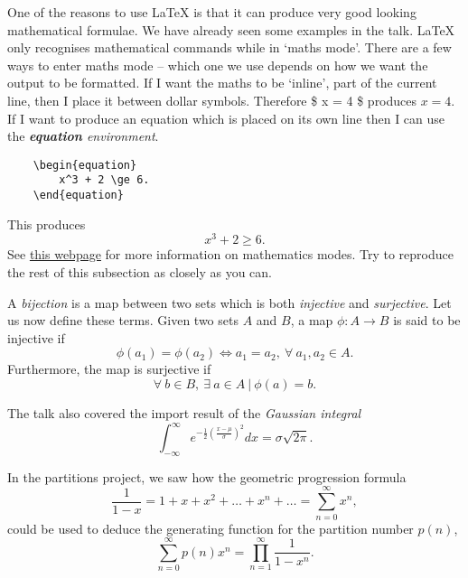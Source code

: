 \documentclass{article}
\begin{document}
One of the reasons to use \LaTeX{} is that it can produce very good looking mathematical formulae. We have already seen some examples in the talk. \LaTeX{} only recognises mathematical commands while in `maths mode'. There are a few ways to enter maths mode -- which one we use depends on how we want the output to be formatted. If I want the maths to be `inline', part of the current line, then I place it between dollar symbols. Therefore \$ x = 4 \$ produces $x=4$. If I want to produce an equation which is placed on its own line then I can use the \emph{\textbf{equation} environment}.
\begin{verbatim}
	\begin{equation}
	    x^3 + 2 \ge 6.
	\end{equation}
\end{verbatim}
This produces
\begin{equation}
	x^3 + 2 \ge 6.
\end{equation}
See \href{https://www.sharelatex.com/learn/Mathematical_expressions}{this webpage} for more information on mathematics modes. Try to reproduce the rest of this subsection as closely as you can.

A \emph{bijection} is a map between two sets which is both \emph{injective} and \emph{surjective}. Let us now define these terms. Given two sets $A$ and $B$, a map $\phi:A \to B$ is said to be injective if
\begin{equation}\label{eq:injective} %
	\phi(a_1) = \phi(a_2) \iff a_1 = a_2,\ \forall\ a_1,a_2 \in A.
\end{equation}
Furthermore, the map is surjective if
\begin{equation}\label{eq:surjective}
	\forall\ b \in B,\ \exists\ a \in A\ |\ \phi(a)=b.
\end{equation}

The talk also covered the import result of the \emph{Gaussian integral}
\begin{equation}
	\int_{-\infty}^\infty e^{-\frac{1}{2}\left( \frac{x - \mu}{\sigma} \right)^2} dx = \sigma\sqrt{2 \pi}.
\end{equation}

In the partitions project, we saw how the geometric progression formula
\begin{equation}
	\frac{1}{1-x} = 1 + x + x^2 + \ldots + x^n + \ldots = \sum_{n=0}^\infty x^n,
\end{equation}
could be used to deduce the generating function for the partition number $p(n)$,
\begin{equation}
	\sum_{n=0}^\infty p(n) x^n = \prod_{n=1}^\infty \frac{1}{1-x^n}.
\end{equation}
\end{document}
